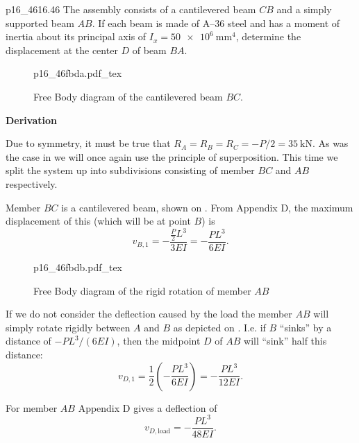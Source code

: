 \documentclass[a4paper]{article}
\newcommand{\incfig}[2][1]{%
  \def\svgwidth{#1\columnwidth}
  {#2.pdf_tex}
}
\newcounter{problem}
\numberwithin{equation}{problem}
\newcommand{\AUheading}[1]{%
  \par\vspace{.4\baselineskip}%
  {\sffamily\bfseries\color{AUblueDark}#1\par}%
  \nobreak%
}
\newenvironment{derivation}[1][Derivation]{%
  \AUheading{#1}
  \begingroup\allowdisplaybreaks
  \setlength{\abovedisplayskip}{6pt}%
  \setlength{\belowdisplayskip}{6pt}%
  \setlength{\abovedisplayshortskip}{4pt}%
  \setlength{\belowdisplayshortskip}{4pt}%
}{\par\endgroup\medskip}
\begin{document}
\begin{problemwithimage}{p16_46}{16.46}\label{pro:16-46}
  The assembly consists of a cantilevered beam $CB$ and a simply supported beam $AB$.
  If each beam is made of A--36 steel and has a moment of inertia about its principal axis of $I_x = \qty{50e6}{\mm^{4}}$, determine the displacement at the center $D$ of beam $BA$.
\end{problemwithimage}

\begin{figure}[ht]
    \centering
    \incfig{p16_46fbda}
    \caption{Free Body diagram of the cantilevered beam $BC$.}
    \label{fig:p16_46fbda}
\end{figure}

\begin{derivation}
  Due to symmetry, it must be true that $R_A = R_B = R_C = - P / 2 = \qty{35}{\kN}$.
  As was the case in  we will once again use the principle of superposition.
  This time we split the system up into subdivisions consisting of member $BC$ and $AB$ respectively.

  Member $BC$ is a cantilevered beam, shown on .
  From Appendix D, the maximum displacement of this (which will be at point $B$) is
  \begin{equation*}
    v_{B,1} = - \frac{\frac{P}{2} L^3}{3 EI} = - \frac{P L^3}{6EI}
  .\end{equation*}


\begin{figure}[ht]
    \centering
    \incfig{p16_46fbdb}
    \caption{Free Body diagram of the rigid rotation of member $AB$}
    \label{fig:p16_46fbdb}
\end{figure}
  If we do not consider the deflection caused by the load the member $AB$ will simply rotate rigidly between $A$ and $B$ as depicted on .
  I.e. if $B$ ``sinks'' by a distance of $- P L^3 / (6EI)$, then the midpoint $D$ of $AB$ will ``sink'' half this distance:
  \begin{equation*}
    v_{D,1} = \frac{1}{2} \left( - \frac{PL^3}{6EI} \right) = - \frac{PL^3}{12EI}
  .\end{equation*}

  For member $AB$ Appendix D gives a deflection of
  \begin{equation*}
    v_{D, \text{load}} = - \frac{PL^3}{48 EI}
  .\end{equation*}
  

\end{derivation}
\end{document}
